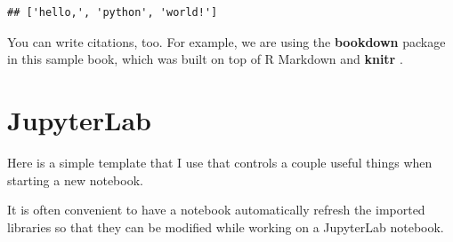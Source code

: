 \documentclass[]{book}
\newenvironment{Shaded}{\begin{snugshade}}{\end{snugshade}}
\newcommand{\DecValTok}[1]{\textcolor[rgb]{0.00,0.00,0.81}{#1}}
\newcommand{\StringTok}[1]{\textcolor[rgb]{0.31,0.60,0.02}{#1}}
\newcommand{\ImportTok}[1]{#1}
\newcommand{\OperatorTok}[1]{\textcolor[rgb]{0.81,0.36,0.00}{\textbf{#1}}}
\newcommand{\NormalTok}[1]{#1}
\begin{document}
\begin{verbatim}
## ['hello,', 'python', 'world!']
\end{verbatim}

You can write citations, too. For example, we are using the
\textbf{bookdown} package \citep{R-bookdown} in this sample book, which
was built on top of R Markdown and \textbf{knitr} \citep{xie2015}.

\chapter{JupyterLab}\label{jupyter}

Here is a simple template that I use that controls a couple useful
things when starting a new notebook.

\begin{Shaded}
\end{Shaded}

It is often convenient to have a notebook automatically refresh the
imported libraries so that they can be modified while working on a
JupyterLab notebook.

\begin{Shaded}
\begin{Highlighting}[]
\OperatorTok{%
\OperatorTok{%
\end{Highlighting}
\end{Shaded}
\end{document}
